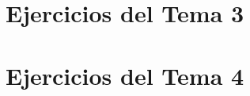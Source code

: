 \documentclass[a4paper]{book}
\begin{document}
\chapter{Ejercicios del Tema 3}
\chapter{Ejercicios del Tema 4}




% 
% 
\end{document}
